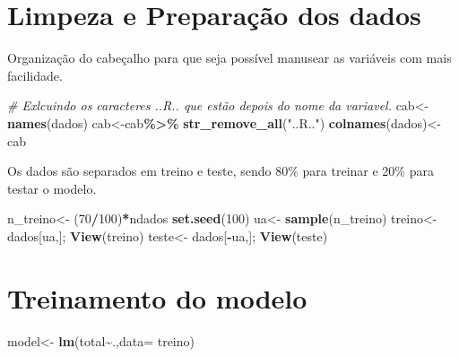 \documentclass[
]{article}
\newenvironment{Shaded}{\begin{snugshade}}{\end{snugshade}}
\newcommand{\CommentTok}[1]{\textcolor[rgb]{0.56,0.35,0.01}{\textit{#1}}}
\newcommand{\DataTypeTok}[1]{\textcolor[rgb]{0.13,0.29,0.53}{#1}}
\newcommand{\DecValTok}[1]{\textcolor[rgb]{0.00,0.00,0.81}{#1}}
\newcommand{\KeywordTok}[1]{\textcolor[rgb]{0.13,0.29,0.53}{\textbf{#1}}}
\newcommand{\NormalTok}[1]{#1}
\newcommand{\OperatorTok}[1]{\textcolor[rgb]{0.81,0.36,0.00}{\textbf{#1}}}
\newcommand{\StringTok}[1]{\textcolor[rgb]{0.31,0.60,0.02}{#1}}
\begin{document}
\hypertarget{limpeza-e-preparauxe7uxe3o-dos-dados}{%
\section{Limpeza e Preparação dos
dados}\label{limpeza-e-preparauxe7uxe3o-dos-dados}}

\n Organização do cabeçalho para que seja possível manusear as variáveis
com mais facilidade.

\begin{Shaded}
\begin{Highlighting}[]
\CommentTok{\# Exlcuindo os caracteres ..R.. que estão depois do nome da variavel.}
\NormalTok{cab\textless{}{-}}\KeywordTok{names}\NormalTok{(dados)}
\NormalTok{cab\textless{}{-}cab}\OperatorTok{\%\textgreater{}\%}\StringTok{ }\KeywordTok{str\_remove\_all}\NormalTok{(}\StringTok{"..R.."}\NormalTok{)}
\KeywordTok{colnames}\NormalTok{(dados)\textless{}{-}}\StringTok{ }\NormalTok{cab}
\end{Highlighting}
\end{Shaded}

\n Os dados são separados em treino e teste, sendo 80\% para treinar e
20\% para testar o modelo.

\begin{Shaded}
\begin{Highlighting}[]
\NormalTok{n\_treino\textless{}{-}}\StringTok{ }\NormalTok{(}\DecValTok{70}\OperatorTok{/}\DecValTok{100}\NormalTok{)}\OperatorTok{*}\NormalTok{ndados}
\KeywordTok{set.seed}\NormalTok{(}\DecValTok{100}\NormalTok{)}
\NormalTok{ua\textless{}{-}}\StringTok{ }\KeywordTok{sample}\NormalTok{(n\_treino)}
\NormalTok{treino\textless{}{-}}\StringTok{ }\NormalTok{dados[ua,]; }\KeywordTok{View}\NormalTok{(treino)}
\NormalTok{teste\textless{}{-}}\StringTok{ }\NormalTok{dados[}\OperatorTok{{-}}\NormalTok{ua,]; }\KeywordTok{View}\NormalTok{(teste)}
\end{Highlighting}
\end{Shaded}

\hypertarget{treinamento-do-modelo}{%
\section{Treinamento do modelo}\label{treinamento-do-modelo}}

\begin{Shaded}
\begin{Highlighting}[]
\NormalTok{model\textless{}{-}}\StringTok{ }\KeywordTok{lm}\NormalTok{(total}\OperatorTok{\textasciitilde{}}\NormalTok{.,}\DataTypeTok{data=}\NormalTok{ treino)}
\end{Highlighting}
\end{Shaded}
\end{document}
